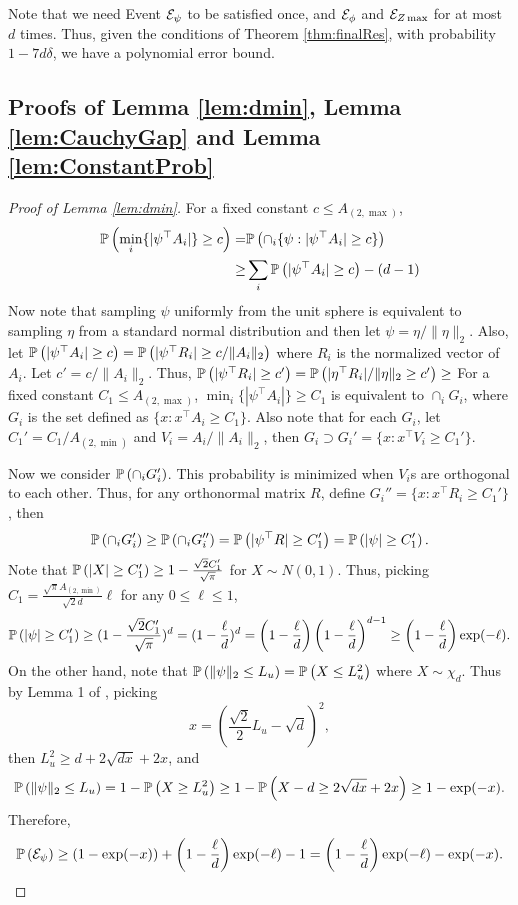 Note that we need Event $\mathcal{E}_{\psi}$ to be satisfied once, and $\mathcal{E}_{\phi}$ and $\mathcal{E}_{Z\max}$ for at most $d$ times. 
Thus, given the conditions of Theorem \ref{thm:finalRes}, with probability $1-7d\delta$, we have a polynomial error bound. 
\subsection{Proofs of Lemma \ref{lem:dmin}, Lemma \ref{lem:CauchyGap} and Lemma \ref{lem:ConstantProb}}
\begin{proof}[Proof of Lemma \ref{lem:dmin}]
For a fixed constant $c \le A_{(2,\max)}$,
\begin{align*}
\mathbb{P}\left(\min_i \{|\psi^{\top}A_i|\} \ge c\right) = & \mathbb{P}\left(\cap_i\{\psi : |\psi^{\top}A_i|\ge c\}\right)\\
 \ge & \sum_i \mathbb{P}\left(|\psi^{\top}A_i|\ge c\right) - (d-1)
\end{align*}
Now note that sampling $\psi$ uniformly from the unit sphere is equivalent to sampling $\eta$ from a standard normal distribution and then let $\psi = \eta/ \|\eta\|_2$.
Also, let $\mathbb{P}\left(|\psi^{\top}A_i|\ge c\right) = \mathbb{P}\left(|\psi^{\top}R_i|\ge c/\|A_i\|_2\right)$ where $R_i$ is the normalized vector of $A_i$. 
Let $c' = c/\|A_i\|_2$. 
Thus, $ \mathbb{P}\left(|\psi^{\top}R_i|\ge c'\right) = \mathbb{P}\left(|\eta^{\top}R_i|/\|\eta\|_2\ge c'\right) \ge $
\fi
For a fixed constant $C_1 \le A_{(2,\max)}$, $\min_i \{|\psi^{\top}A_i|\} \ge C_1$ is equivalent to  $\cap_i G_i$, where $G_i$ is the set defined as $\{x: x^{\top}A_i\ge C_1\}$.  
Also note that for each $G_i$, let $C_1' = C_1/A_{(2,\min)}$ and $V_i = A_i/\|A_i\|_2$, then $G_i \supset G_i' = \{x: x^{\top}V_i\ge C_1'\}$.

Now we consider $\mathbb{P}\left(\cap_i G_i'\right)$. 
This probability is minimized when $V_i$s are orthogonal to each other. 
Thus, for any orthonormal matrix $R$, define $G_i'' = \{x: x^{\top}R_i\ge C_1'\}$, then 
\[
\mathbb{P}\left(\cap_i G_i'\right) \ge \mathbb{P}\left(\cap_i G_i''\right) = \mathbb{P}\left(|\psi^{\top}R| \ge C_1'\right) = \mathbb{P}\left(|\psi| \ge C_1'\right).
\]
Note that $\mathbb{P}\left(|X|\ge C_1'\right) \ge 1- \frac{\sqrt{2}C_1'}{\sqrt{\pi}}$ for $X\sim N(0,1)$. Thus, picking $C_1 = \frac{\sqrt{\pi}A_{(2,\min)}}{\sqrt{2}d} \ell$ for any $0\le \ell \le 1$, 
\begin{equation}
\label{eq:GaussianLowerBound}
\mathbb{P}\left(|\psi| \ge C_1'\right) \ge (1- \frac{\sqrt{2}C_1'}{\sqrt{\pi}})^d = (1-\frac{\ell}{d})^d = \left(1- \frac{\ell}{d}\right)\left(1-\frac{\ell}{d}\right)^{d-1} \ge \left(1- \frac{\ell}{d}\right)\exp(-\ell).
\end{equation}
On the other hand, note that $\mathbb{P}\left(\|\psi\|_2 \le L_u\right) = \mathbb{P}\left(X \le L_u^2\right)$ where $X \sim \chi_d$.
Thus by Lemma 1 of \citep{laurent2000adaptive}, picking
\[
x = \left(\frac{\sqrt{2}}{2}L_u - \sqrt{d}\right)^2,
\]
then $L_u^2 \ge d+2\sqrt{dx}+2x$, and
\begin{equation}
\label{eq:ProbEpsi}
\mathbb{P}\left(\|\psi\|_2 \le L_u\right) = 1- \mathbb{P}\left(X\ge L_u^2\right) \ge 1- \mathbb{P}\left(X - d\ge 2\sqrt{dx} +2x\right) \ge 1-\exp(-x).
\end{equation}
Therefore, 
\begin{equation}
\label{eq:ProbEpsi2}
\mathbb{P}\left(\mathcal{E}_{\psi}\right) \ge (1-\exp(-x))+\left(1- \frac{\ell}{d}\right)\exp(-\ell)-1 = \left(1- \frac{\ell}{d}\right)\exp(-\ell)-\exp(-x).
\end{equation}
\end{proof}
